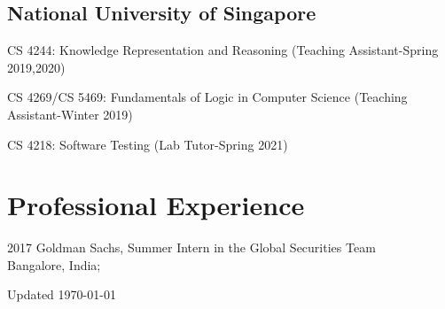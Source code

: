 \documentclass[12pt,letterpaper]{report}
\newcommand{\listitemspace}{0.15em}
\renewenvironment{itemize}
{\begin{list}{}{\setlength{\leftmargin}{0em}
            \setlength{\parskip}{0em}
            \setlength{\itemsep}{\listitemspace}
            \setlength{\parsep}{\listitemspace}}}
    {\end{list}}
\begin{document}
    \subsection*{National University of Singapore}
    
    \begin{itemize}
    	
 \item   CS 4244: Knowledge Representation and Reasoning (Teaching Assistant-Spring 2019,2020)
  \item   CS 4269/CS 5469: Fundamentals of Logic in Computer Science (Teaching Assistant-Winter 2019)
  \item   CS 4218: Software Testing (Lab Tutor-Spring 2021)
    
	\end{itemize}
    
    \section*{Professional Experience}

    \begin{tablist}

        \item[2017] \tab Goldman Sachs, Summer Intern in the Global Securities Team\\
        Bangalore, India;

    \end{tablist}


    \begin{center}
        \vfill
        Updated \monthyeardate\today
    \end{center}
\end{document}
